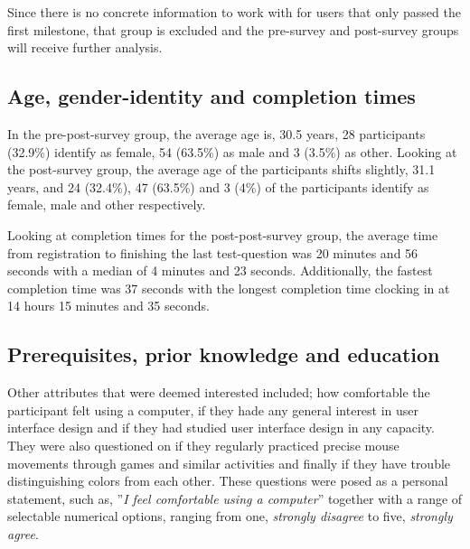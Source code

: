 \documentclass[nofilelist,dvipsnames]{cslthse-msc}
\begin{document}
{    Since there is no concrete information to work with for users that only
    passed the first milestone, that group is excluded and the pre-survey and
    post-survey groups will receive further analysis.

      \subsection{Age, gender-identity and completion times}

      In the pre-post-survey group, the average age is, 30.5 years, 28
      participants (32.9\%) identify as female, 54 (63.5\%) as male and 3
      (3.5\%) as other. Looking at the post-survey group, the average age of
      the participants shifts slightly, 31.1 years, and 24 (32.4\%), 47
      (63.5\%) and 3 (4\%) of the participants identify as female, male and
      other respectively.

      Looking at completion times for the post-post-survey group, the average
      time from registration to finishing the last test-question was 20 minutes
      and 56 seconds with a median of 4 minutes and 23 seconds. Additionally,
      the fastest completion time was 37 seconds with the longest completion
      time clocking in at 14 hours 15 minutes and 35 seconds.

      \subsection{Prerequisites, prior knowledge and education}

      Other attributes that were deemed interested included; how comfortable
      the participant felt using a computer, if they hade any general interest
      in user interface design and if they had studied user interface design in
      any capacity. They were also questioned on if they regularly practiced
      precise mouse movements through games and similar activities and finally
      if they have trouble distinguishing colors from each other. These
      questions were posed as a personal statement, such as, ''\textit{I feel
        comfortable using a computer}'' together with a range of selectable
      numerical options, ranging from one, \textit{strongly disagree} to five,
      \textit{strongly agree}.

%
%



}
\end{document}
